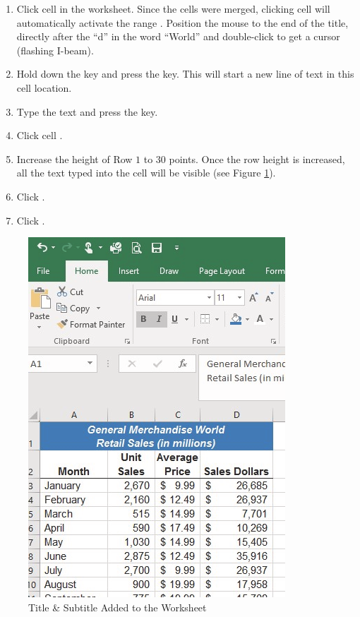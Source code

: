 \begin{enumerate}
	\item Click cell  in the  worksheet. Since the cells were merged, clicking cell  will automatically activate the range . Position the mouse to the end of the title, directly after the ``d'' in the word ``World'' and double-click to get a cursor (flashing I-beam).
	\item Hold down the  key and press the  key. This will start a new line of text in this cell location.
	\item Type the text  and press the  key.
	\item Click cell . 
	\item Increase the height of Row $ 1 $ to $ 30 $ points. Once the row height is increased, all the text typed into the cell will be visible (see Figure \ref{01:fig41}).
	\item Click .
	\item Click .

\end{enumerate}

\begin{figure}[H]
	\centering
	\includegraphics[width=\maxwidth{.95\linewidth}]{gfx/ch01_fig41}
	\caption{Title \& Subtitle Added to the Worksheet}
	\label{01:fig41}
\end{figure}


